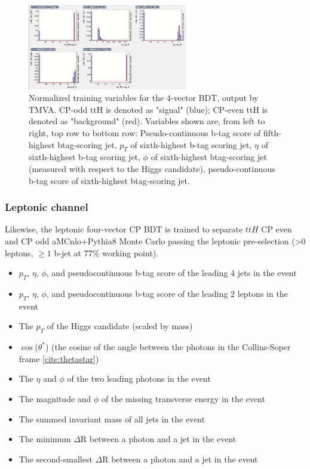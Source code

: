 \begin{figure}[htbp]
  \centering
  	\includegraphics[width=0.62\textwidth]{figures/TMVABDTStudies/had-vbls4vec/had4vecvbls6.png}
  \caption{Normalized training variables for the 4-vector BDT, output by TMVA. CP-odd ttH is denoted as "signal" (blue); CP-even ttH is denoted as "background" (red). Variables shown are, from left to right, top row to bottom row: Pseudo-continuous b-tag score of fifth-highest btag-scoring jet, $p_{T}$ of sixth-highest b-tag scoring jet, $\eta$ of sixth-highest b-tag scoring jet, $\phi$ of sixth-highest btag-scoring jet (measured with respect to the Higgs candidate), pseudo-continuous b-tag score of sixth-highest btag-scoring jet.}
  \label{fig:had4vecvbls6}
  
\end{figure}

\clearpage

\subsubsection{Leptonic channel}

Likewise, the leptonic  four-vector CP BDT is trained to separate $ttH$ CP even and CP odd aMCnlo+Pythia8 Monte Carlo passing the leptonic pre-selection (>0 leptons, $\ge1$ b-jet at 77\% working point).

\begin{itemize}
\item $p_{T}$, $\eta$, $\phi$, and pseudocontinuous b-tag score of the leading 4 jets in the event
\item $p_{T}$, $\eta$, $\phi$, and pseudocontinuous b-tag score of the leading 2 leptons in the event
\item The $p_{T}$ of the Higgs candidate (scaled by mass)
\item  $\cos$($\theta^{*}$) (the cosine of the angle between the photons in the Collins-Soper frame \ref{cite:thetastar})
\item The $\eta$ and $\phi$ of the two leading photons in the event
\item The magnitude and $\phi$ of the missing transverse energy in the event
\item The summed invariant mass of all jets in the event
\item The minimum $\Delta$R between a photon and a jet in the event
\item The second-smallest $\Delta$R between a photon and a jet in the event
\end{itemize} 

